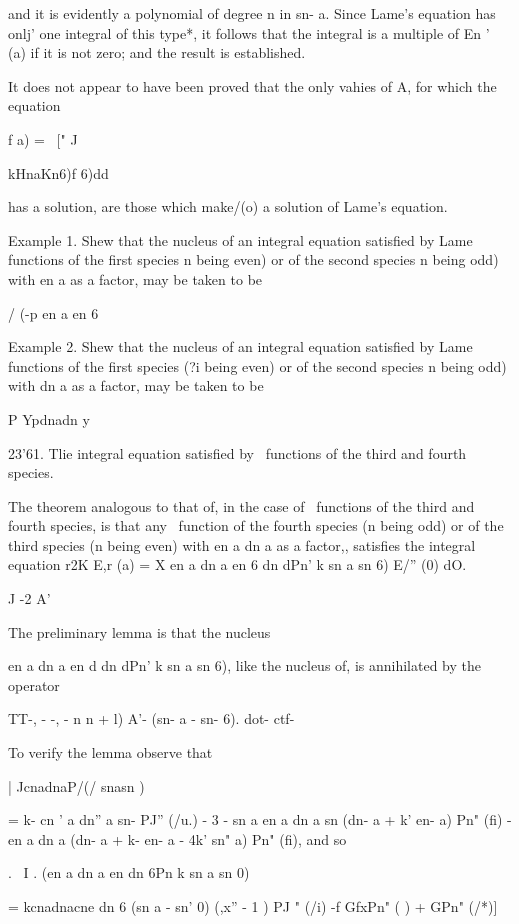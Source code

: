 {{{{{{{and it is evidently a polynomial of degree n in sn- a. Since Lame's
equation has onlj' one integral of this type*, it follows that the
integral is a multiple of En ' (a) if it is not zero; and the result
is established.

It does not appear to have been proved that the only vahies of A, for
which the equation

f a) = \ [" J\ \ {kHnaKn6)f 6)dd

has a solution, are those which make/(o) a solution of Lame's
equation.

Example 1. Shew that the nucleus of an integral equation satisfied by
Lame functions of the first species n being even) or of the second
species n being odd) with en a as a factor, may be taken to be

/  (-p en a en 6

Example 2. Shew that the nucleus of an integral equation satisfied by
Lame functions of the first species (?i being even) or of the second
species n being odd) with dn a as a factor, may be taken to be

P Ypdnadn y

23'61. Tlie integral equation satisfied by \Lame\ functions of the third
and fourth species.

The theorem analogous to that of, in the case of \Lame\ functions
of the third and fourth species, is that any \Lame\ function of the
fourth species (n being odd) or of the third species (n being even)
with en a dn a as a factor,, satisfies the integral equation r2K E,r
(a) = X en a dn a en 6 dn dPn' k sn a sn 6) E/'' (0) dO.

J -2 A'

The preliminary lemma is that the nucleus

en a dn a en d dn dPn' k sn a sn 6), like the nucleus of, is
annihilated by the operator

TT-, - -, - n n + l) A'- (sn- a - sn- 6). dot- ctf-

To verify the lemma observe that

| JcnadnaP/(/ snasn )

= k- cn ' a dn'' a sn- PJ'' (/u.) - 3 - sn a en a dn a sn (dn- a + k'
en- a) Pn" (fi) - en a dn a (dn- a + k- en- a - 4k' sn" a) Pn" (fi),
and so

. \ I . (en a dn a en dn 6Pn k sn a sn 0)\

= kcnadnacne dn 6 (sn a - sn' 0) (,x'' - 1 ) PJ " (/i) -f GfxPn" ( ) +
GPn" (/*)]

}}}}}}}}

